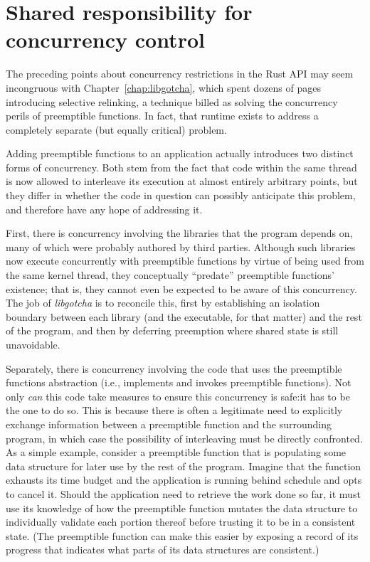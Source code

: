 \section{Shared responsibility for concurrency control}

The preceding points about concurrency restrictions in the Rust API may seem
incongruous with Chapter~\ref{chap:libgotcha}, which spent dozens of pages
introducing selective relinking, a technique billed as solving the concurrency perils
of preemptible functions.  In fact, that runtime exists to address a completely
separate (but equally critical) problem.

Adding preemptible functions to an application actually introduces two distinct forms
of concurrency.  Both stem from the fact that code within the same thread is now
allowed to interleave its execution at almost entirely arbitrary points, but they
differ in whether the code in question can possibly anticipate this problem, and
therefore have any hope of addressing it.

First, there is concurrency involving the libraries that the program depends on, many
of which were probably authored by third parties.  Although such libraries now
execute concurrently with preemptible functions by virtue of being used from the same
kernel thread, they conceptually ``predate'' preemptible functions' existence; that
is, they cannot even be expected to be aware of this concurrency.  The job of
\textit{libgotcha} is to reconcile this, first by establishing an isolation boundary
between each library (and the executable, for that matter) and the rest of the
program, and then by deferring preemption where shared state is still unavoidable.

Separately, there is concurrency involving the code that uses the preemptible
functions abstraction (i.e., implements and invokes preemptible functions).  Not only
\textit{can} this code take measures to ensure this concurrency is safe:\@ it has to
be the one to do so.  This is because there is often a legitimate need to explicitly
exchange information between a preemptible function and the surrounding program, in
which case the possibility of interleaving must be directly confronted.  As a simple
example, consider a preemptible function that is populating some data structure for
later use by the rest of the program.  Imagine that the function exhausts its
time budget and the application is running behind schedule and opts to cancel it.
Should the application need to retrieve the work done so far, it must use its
knowledge of how the preemptible function mutates the data structure to individually
validate each portion thereof before trusting it to be in a consistent state.  (The
preemptible function can make this easier by exposing a record of its progress that
indicates what parts of its data structures are consistent.)

